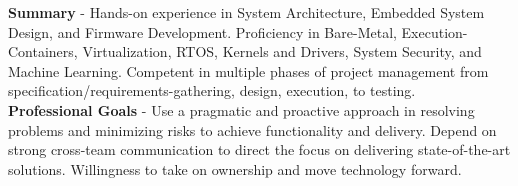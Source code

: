 \textbf{Summary} - Hands-on experience in System Architecture, Embedded System Design, and Firmware Development. Proficiency in Bare-Metal, Execution-Containers, Virtualization, RTOS, \faLinux Kernels and Drivers, System Security, and Machine Learning. Competent in multiple phases of project management from specification/requirements-gathering, design, execution, to testing.\\
\textbf{Professional Goals} - Use a pragmatic and proactive approach in resolving problems and minimizing risks to achieve functionality and delivery. Depend on strong cross-team communication to direct the focus on delivering state-of-the-art solutions. Willingness to take on ownership and move technology forward.
